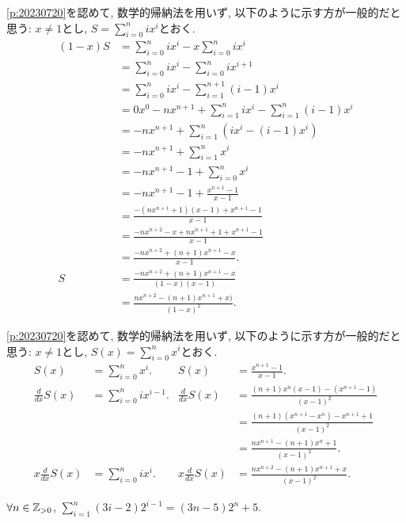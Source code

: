 \begin{rem}
  \cref{p:20230720}を認めて,
  数学的帰納法を用いず, 以下のように示す方が一般的だと思う:
  $x\neq 1$とし,
  $S=\sum_{i=0}^{n}ix^i$とおく.
  \begin{align*}
    (1-x)S
    &=\sum_{i=0}^{n}ix^i-x\sum_{i=0}^{n}ix^i\\
    &=\sum_{i=0}^{n}ix^i-\sum_{i=0}^{n}ix^{i+1}\\
    &=\sum_{i=0}^{n}ix^i-\sum_{i=1}^{n+1}(i-1)x^{i}\\
    &=0x^0-nx^{n+1}+\sum_{i=1}^{n}ix^i-\sum_{i=1}^{n}(i-1)x^{i}\\
    &=-nx^{n+1}+\sum_{i=1}^{n}(ix^i-(i-1)x^{i})\\
    &=-nx^{n+1}+\sum_{i=1}^{n}x^{i}\\
    &=-nx^{n+1}-1+\sum_{i=0}^{n}x^{i}\\
    &=-nx^{n+1}-1+\frac{x^{n+1}-1}{x-1}\\
    &=\frac{-(nx^{n+1}+1)(x-1)+x^{n+1}-1}{x-1}\\
    &=\frac{-nx^{n+2}-x+nx^{n+1}+1+x^{n+1}-1}{x-1}\\
    &=\frac{-nx^{n+2}+(n+1)x^{n+1}-x}{x-1}.\\
    S&=\frac{-nx^{n+2}+(n+1)x^{n+1}-x}{(1-x)(x-1)}\\
    &=\frac{nx^{n+2}-(n+1)x^{n+1}+x)}{(1-x)^2}.
  \end{align*}
\end{rem}
\begin{rem}
  \cref{p:20230720}を認めて,
  数学的帰納法を用いず, 以下のように示す方が一般的だと思う:
  $x\neq 1$とし,
  $S(x)=\sum_{i=0}^{n}x^i$とおく.
  \begin{align*}
    S(x)&=\sum_{i=0}^{n}x^i.&
    S(x)&=\frac{x^{n+1}-1}{x-1}.\\
    \frac{d}{dx}S(x)&=\sum_{i=0}^{n}ix^{i-1}.&
    \frac{d}{dx}S(x)
    &=\frac{(n+1)x^{n}(x-1)-(x^{n+1}-1)}{(x-1)^2}\\
    &&&=\frac{(n+1)(x^{n+1}-x^{n})-x^{n+1}+1}{(x-1)^2}\\
    &&&=\frac{nx^{n+1}-(n+1)x^{n}+1}{(x-1)^2}.\\
    x\frac{d}{dx}S(x)&=\sum_{i=0}^{n}ix^i.&
    x\frac{d}{dx}S(x)
    &=\frac{nx^{n+2}-(n+1)x^{n+1}+x}{(x-1)^2}.
  \end{align*}
\end{rem}
    
\begin{prop}
  \label{p:20230722}
  $\forall n\in \mathbb{Z}_{>0}$,
  $\sum_{i=1}^n (3i-2)2^{i-1}=(3n-5)2^n+5$.
\end{prop}

